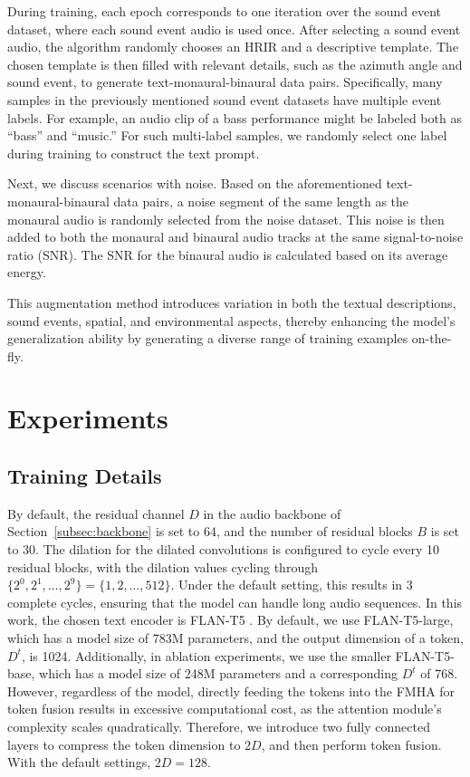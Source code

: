 \documentclass{IEEEtran}
\begin{document}
During training, each epoch corresponds to one iteration over the sound event dataset, where each sound event audio is used once. After selecting a sound event audio, the algorithm randomly chooses an HRIR and a descriptive template. The chosen template is then filled with relevant details, such as the azimuth angle and sound event, to generate text-monaural-binaural data pairs. Specifically, many samples in the previously mentioned sound event datasets have multiple event labels. For example, an audio clip of a bass performance might be labeled both as ``bass'' and ``music.'' For such multi-label samples, we randomly select one label during training to construct the text prompt.

Next, we discuss scenarios with noise. Based on the aforementioned text-monaural-binaural data pairs,  a noise segment of the same length as the monaural audio is randomly selected from the noise dataset. This noise is then added to both the monaural and binaural audio tracks at the same signal-to-noise ratio (SNR). The SNR for the binaural audio is calculated based on its average energy.

This augmentation method introduces variation in both the textual descriptions, sound events, spatial, and environmental aspects, thereby enhancing the model's generalization ability by generating a diverse range of training examples on-the-fly.


\section{Experiments}   \label{sec:exp}
\subsection{Training Details}
By default, the residual channel $D$ in the audio backbone of Section~\ref{subsec:backbone} is set to 64, and the number of residual blocks $B$ is set to 30. The dilation for the dilated convolutions is configured to cycle every 10 residual blocks, with the dilation values cycling through $\{2^0, 2^1, \dots, 2^9\} = \{1, 2, \dots, 512\}$. Under the default setting, this results in 3 complete cycles, ensuring that the model can handle long audio sequences. In this work, the chosen text encoder is FLAN-T5 \cite{chung2024scaling}. By default, we use FLAN-T5-large, which has a model size of 783M parameters, and the output dimension of a token, $D^t$, is 1024. Additionally, in ablation experiments, we use the smaller FLAN-T5-base, which has a model size of 248M parameters and a corresponding $D^t$ of 768. However, regardless of the model, directly feeding the tokens into the FMHA for token fusion results in excessive computational cost, as the attention module's complexity scales quadratically. Therefore, we introduce two fully connected layers to compress the token dimension to $2D$, and then perform token fusion. With the default settings, $2D = 128$.
\end{document}
